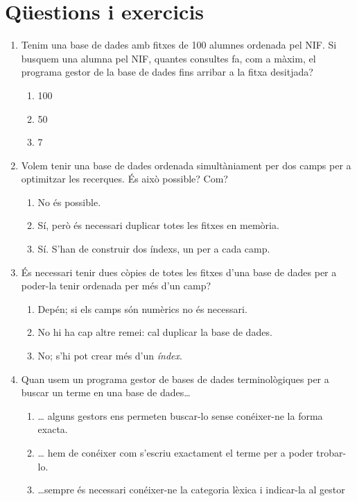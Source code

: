 \section{Qüestions i exercicis}
\begin{enumerate}

\item 
   Tenim una base de dades amb fitxes de 100 alumnes ordenada pel NIF.
   Si busquem una alumna pel NIF, quantes consultes fa, com a màxim,
   el programa gestor de la base de dades fins arribar a la fitxa
   desitjada?
   
\begin{enumerate}
\item 100
\item 50
\item 7
\end{enumerate}

\item 
   Volem tenir una base de dades ordenada simultàniament per dos
 camps per a optimitzar les recerques. És això possible? Com?
   
\begin{enumerate}
\item No és possible.
\item Sí, però és necessari duplicar totes les fitxes en
     memòria.
\item Sí. S'han de construir dos
     índexs, un per a cada camp.
\end{enumerate}

\item És necessari tenir dues còpies de totes les fitxes d'una base
   de dades per a poder-la tenir ordenada per més d'un camp?
\begin{enumerate}
\item Depén; si els camps són numèrics no és necessari.
\item No hi ha cap altre remei: cal duplicar la base de dades.
\item No; s'hi pot crear més d'un \emph{índex}.
\end{enumerate}
\item Quan usem un programa gestor de bases de dades
   terminològiques per a buscar un terme en una base de dades{\ldots}
   
\begin{enumerate}
\item {\ldots} alguns gestors ens permeten buscar-lo sense
      conéixer-ne la forma exacta.
\item {\ldots} hem de conéixer com s'escriu exactament el terme
      per a poder trobar-lo.
\item {\ldots}sempre és necessari conéixer-ne la categoria lèxica
      i indicar-la al gestor
\end{enumerate}


\end{enumerate}
